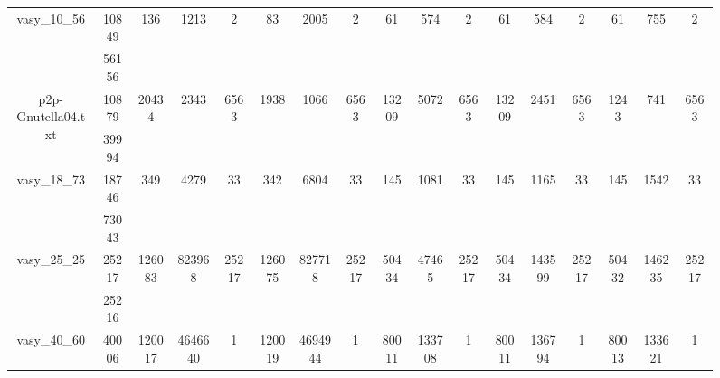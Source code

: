 \documentclass[../master/master.tex]{subfiles}
\begin{document}
\begin{figure}
\begin{adjustbox}{angle=90}
\begin{tabular}{ |c|c||c|c|c||c|c|c||c|c|c||c|c|c||c|c|c|| }
\multirow{2}{3.4em}{vasy\_10\_56} & 10849 & \multirow{2}{3.4em}{136} & \multirow{2}{3.4em}{1213} & \multirow{2}{3.4em}{2} & \multirow{2}{3.4em}{83} & \multirow{2}{3.4em}{2005} & \multirow{2}{3.4em}{2} & \multirow{2}{3.4em}{61} & \multirow{2}{3.4em}{574} & \multirow{2}{3.4em}{2} & \multirow{2}{3.4em}{61} & \multirow{2}{3.4em}{584} & \multirow{2}{3.4em}{2} & \multirow{2}{3.4em}{61} & \multirow{2}{3.4em}{755} & \multirow{2}{3.4em}{2} \\
\cline{2-2}
 & 56156  &  &  &  &  &  &  &  &  &  &  &  &  &  &  &  \\
\hline
\multirow{2}{3.4em}{p2p-Gnutella04.txt} & 10879 & \multirow{2}{3.4em}{20434} & \multirow{2}{3.4em}{2343} & \multirow{2}{3.4em}{6563} & \multirow{2}{3.4em}{1938} & \multirow{2}{3.4em}{1066} & \multirow{2}{3.4em}{6563} & \multirow{2}{3.4em}{13209} & \multirow{2}{3.4em}{5072} & \multirow{2}{3.4em}{6563} & \multirow{2}{3.4em}{13209} & \multirow{2}{3.4em}{2451} & \multirow{2}{3.4em}{6563} & \multirow{2}{3.4em}{1243} & \multirow{2}{3.4em}{741} & \multirow{2}{3.4em}{6563} \\
\cline{2-2}
 & 39994  &  &  &  &  &  &  &  &  &  &  &  &  &  &  &  \\
\hline
\multirow{2}{3.4em}{vasy\_18\_73} & 18746 & \multirow{2}{3.4em}{349} & \multirow{2}{3.4em}{4279} & \multirow{2}{3.4em}{33} & \multirow{2}{3.4em}{342} & \multirow{2}{3.4em}{6804} & \multirow{2}{3.4em}{33} & \multirow{2}{3.4em}{145} & \multirow{2}{3.4em}{1081} & \multirow{2}{3.4em}{33} & \multirow{2}{3.4em}{145} & \multirow{2}{3.4em}{1165} & \multirow{2}{3.4em}{33} & \multirow{2}{3.4em}{145} & \multirow{2}{3.4em}{1542} & \multirow{2}{3.4em}{33} \\
\cline{2-2}
 & 73043  &  &  &  &  &  &  &  &  &  &  &  &  &  &  &  \\
\hline
\multirow{2}{3.4em}{vasy\_25\_25} & 25217 & \multirow{2}{3.4em}{126083} & \multirow{2}{3.4em}{823968} & \multirow{2}{3.4em}{25217} & \multirow{2}{3.4em}{126075} & \multirow{2}{3.4em}{827718} & \multirow{2}{3.4em}{25217} & \multirow{2}{3.4em}{50434} & \multirow{2}{3.4em}{47465} & \multirow{2}{3.4em}{25217} & \multirow{2}{3.4em}{50434} & \multirow{2}{3.4em}{143599} & \multirow{2}{3.4em}{25217} & \multirow{2}{3.4em}{50432} & \multirow{2}{3.4em}{146235} & \multirow{2}{3.4em}{25217} \\
\cline{2-2}
 & 25216  &  &  &  &  &  &  &  &  &  &  &  &  &  &  &  \\
\hline
\multirow{2}{3.4em}{vasy\_40\_60} & 40006 & \multirow{2}{3.4em}{120017} & \multirow{2}{3.4em}{4646640} & \multirow{2}{3.4em}{1} & \multirow{2}{3.4em}{120019} & \multirow{2}{3.4em}{4694944} & \multirow{2}{3.4em}{1} & \multirow{2}{3.4em}{80011} & \multirow{2}{3.4em}{133708} & \multirow{2}{3.4em}{1} & \multirow{2}{3.4em}{80011} & \multirow{2}{3.4em}{136794} & \multirow{2}{3.4em}{1} & \multirow{2}{3.4em}{80013} & \multirow{2}{3.4em}{133621} & \multirow{2}{3.4em}{1} \\

\end{tabular}
\end{adjustbox}
\end{figure}
\end{document}
